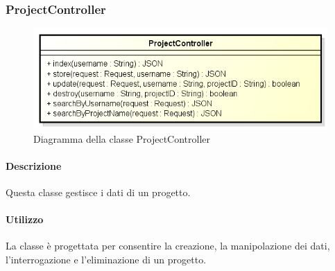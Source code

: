 \newpage
\subsubsection{ProjectController}
\begin{figure}[h]
\centering
\includegraphics[width=0.8\linewidth]{img/back_end_http_controllers_projectController}
\caption[Diagramma della classe ProjectController]{Diagramma della classe ProjectController}
\label{fig:back_end_http_controllers_projectController}
\end{figure}

	\paragraph{Descrizione}
		Questa classe gestisce i dati di un progetto.
	\paragraph{Utilizzo}
		La classe è progettata per consentire la creazione, la manipolazione dei dati, l'interrogazione e l'eliminazione di un progetto.
		
